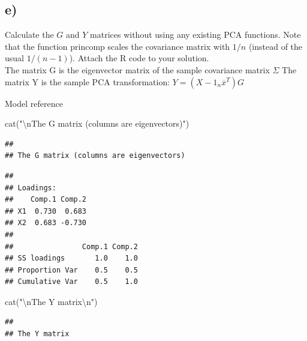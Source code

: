 \documentclass[
]{article}
\newenvironment{Shaded}{\begin{snugshade}}{\end{snugshade}}
\newcommand{\FunctionTok}[1]{\textcolor[rgb]{0.00,0.00,0.00}{#1}}
\newcommand{\NormalTok}[1]{#1}
\newcommand{\SpecialCharTok}[1]{\textcolor[rgb]{0.00,0.00,0.00}{#1}}
\newcommand{\StringTok}[1]{\textcolor[rgb]{0.31,0.60,0.02}{#1}}
\begin{document}
\hypertarget{e}{%
\subsection{e)}\label{e}}

Calculate the \(G\) and \(Y\) matrices without using any existing PCA
functions. Note that the function princomp scales the covariance matrix
with \(1/n\) (instead of the usual \(1/(n-1)\)). Attach the R code to
your solution.\\

The matrix G is the eigenvector matrix of the sample covariance matrix
\(\Sigma\) The matrix Y is the sample PCA transformation:
\(Y = (X - 1_n\overline{x}^T)G\)

Model reference

\begin{Shaded}
\begin{Highlighting}[]
\FunctionTok{cat}\NormalTok{(}\StringTok{"}\SpecialCharTok{\textbackslash{}n}\StringTok{The G matrix (columns are eigenvectors)"}\NormalTok{)}
\end{Highlighting}
\end{Shaded}

\begin{verbatim}
## 
## The G matrix (columns are eigenvectors)
\end{verbatim}

\begin{Shaded}
\end{Shaded}

\begin{verbatim}
## 
## Loadings:
##    Comp.1 Comp.2
## X1  0.730  0.683
## X2  0.683 -0.730
## 
##                Comp.1 Comp.2
## SS loadings       1.0    1.0
## Proportion Var    0.5    0.5
## Cumulative Var    0.5    1.0
\end{verbatim}

\begin{Shaded}
\begin{Highlighting}[]
\FunctionTok{cat}\NormalTok{(}\StringTok{"}\SpecialCharTok{\textbackslash{}n}\StringTok{The Y matrix}\SpecialCharTok{\textbackslash{}n}\StringTok{"}\NormalTok{)}
\end{Highlighting}
\end{Shaded}

\begin{verbatim}
## 
## The Y matrix
\end{verbatim}
\end{document}
